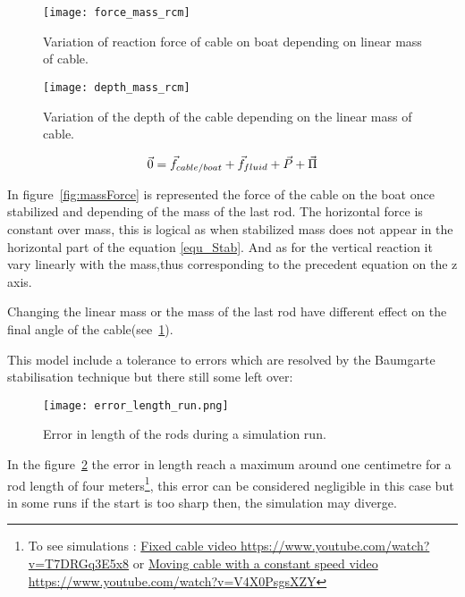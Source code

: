 \begin{figure}[H]
\centering
    \begin{minipage}[b]{0.4\textwidth}
    \centering
    \texttt{[image: force\_mass\_rcm]}
    \caption{Variation of reaction force of cable on boat depending on linear  mass of cable.}
    \label{fig:massForce}
    \end{minipage}
    \hfill
    \begin{minipage}[b]{0.45\textwidth}
    \centering
    \texttt{[image: depth\_mass\_rcm]}
    \caption{Variation of the depth of the cable depending on the linear mass of cable.}
    \label{fig:linmassAngle}
    \end{minipage}
\end{figure}

\begin{equation}
 \vec{0} = \vec{f}_{cable/boat}+\vec{f}_{fluid}+\vec{P}+\vec{\Pi}\\
 \label{equ_Stab}
\end{equation}

In figure~\ref{fig:massForce} is represented the force of the cable on the boat once stabilized and depending of the mass of the last rod. The horizontal force is constant over mass, this is logical as when stabilized mass does not appear in the horizontal part of the equation \eqref{equ_Stab}. And as for the vertical reaction it vary linearly with the mass,thus corresponding to the precedent equation on the z axis.

Changing the linear mass or the mass of the last rod have different effect on the final angle of the cable(see~\ref{fig:linmassAngle}).

This model include a tolerance to errors which are resolved by the Baumgarte stabilisation technique but there still some left over:


\begin{figure}[H]
\centering
    \texttt{[image: error\_length\_run.png]}
    \caption{Error in length of the rods during a simulation run.}
    \label{fig:errorLRod}
\end{figure}

In the figure~\ref{fig:errorLRod} the error in length reach a maximum around one centimetre for a rod length of four meters\footnote{To see simulations : \href{https://www.youtube.com/watch?v=T7DRGq3E5x8}{Fixed cable video https://www.youtube.com/watch?v=T7DRGq3E5x8} or \href{https://www.youtube.com/watch?v=V4X0PsgsXZY}{Moving cable with a constant speed video https://www.youtube.com/watch?v=V4X0PsgsXZY}}, this error can be considered negligible in this case but in some runs if the start is too sharp then, the simulation may diverge.

